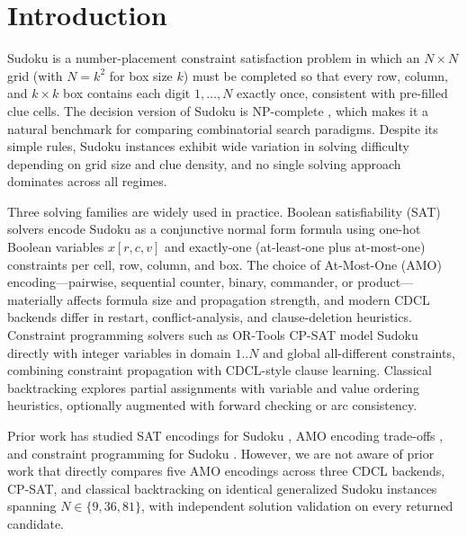 \documentclass[a4paper,fleqn]{cas-sc}
\begin{document}
\maketitle


\section{Introduction}

Sudoku is a number-placement constraint satisfaction problem in which an \(N\times N\) grid (with \(N=k^2\) for box size \(k\)) must be completed so that every row, column, and \(k\times k\) box contains each digit \(1,\dots,N\) exactly once, consistent with pre-filled clue cells. The decision version of Sudoku is NP-complete \citep{yato2003sudoku}, which makes it a natural benchmark for comparing combinatorial search paradigms. Despite its simple rules, Sudoku instances exhibit wide variation in solving difficulty depending on grid size and clue density, and no single solving approach dominates across all regimes.

Three solving families are widely used in practice. Boolean satisfiability (SAT) solvers encode Sudoku as a conjunctive normal form formula using one-hot Boolean variables \(x[r,c,v]\) and exactly-one (at-least-one plus at-most-one) constraints per cell, row, column, and box. The choice of At-Most-One (AMO) encoding---pairwise, sequential counter, binary, commander, or product---materially affects formula size and propagation strength, and modern CDCL backends differ in restart, conflict-analysis, and clause-deletion heuristics. Constraint programming solvers such as OR-Tools CP-SAT model Sudoku directly with integer variables in domain \(1..N\) and global all-different constraints, combining constraint propagation with CDCL-style clause learning. Classical backtracking explores partial assignments with variable and value ordering heuristics, optionally augmented with forward checking or arc consistency.

Prior work has studied SAT encodings for Sudoku \citep{lynce2006sudoku}, AMO encoding trade-offs \citep{sinz2005towards,nguyen2020empirical,hn2013efficient,klieber2007effective,chen2010new,frisch2010sat}, and constraint programming for Sudoku \citep{simonis2005sudoku,aaai2007interactive}. However, we are not aware of prior work that directly compares five AMO encodings across three CDCL backends, CP-SAT, and classical backtracking on identical generalized Sudoku instances spanning \(N \in \{9, 36, 81\}\), with independent solution validation on every returned candidate.
\end{document}
